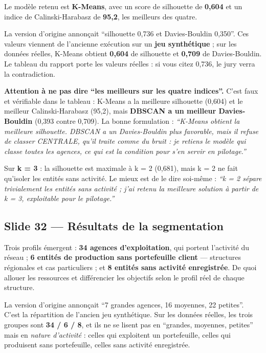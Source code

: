 \documentclass[a4paper,11pt]{article}
\begin{document}
Le modèle retenu est \textbf{K-Means}, avec un score de silhouette de
\textbf{0,604} et un indice de Calinski-Harabasz de \textbf{95,2}, les meilleurs
des quatre.

\begin{corrige}
La version d'origine annonçait \enquote{silhouette 0,736 et Davies-Bouldin
0,350}. Ces valeurs viennent de l'ancienne exécution sur un \textbf{jeu
synthétique} ; sur les données réelles, K-Means obtient \textbf{0,604} de
silhouette et \textbf{0,709} de Davies-Bouldin. Le tableau du rapport porte les
valeurs réelles : si vous citez 0,736, le jury verra la contradiction.
\end{corrige}

\begin{coeur}
\textbf{Attention à ne pas dire \enquote{les meilleurs sur les quatre
indices}.} C'est faux et vérifiable dans le tableau : K-Means a la meilleure
silhouette (0,604) et le meilleur Calinski-Harabasz (95,2), mais \textbf{DBSCAN
a un meilleur Davies-Bouldin} (0,393 contre 0,709). La bonne formulation :
\emph{\enquote{K-Means obtient la meilleure silhouette. DBSCAN a un
Davies-Bouldin plus favorable, mais il refuse de classer CENTRALE, qu'il traite
comme du bruit : je retiens le modèle qui classe toutes les agences, ce qui est
la condition pour s'en servir en pilotage.}}
\end{coeur}

\begin{note}
\small Sur \textbf{k = 3} : la silhouette est maximale à k = 2 (0,681), mais
k = 2 ne fait qu'isoler les entités sans activité. Le mieux est de le dire
soi-même : \emph{\enquote{k = 2 sépare trivialement les entités sans activité ;
j'ai retenu la meilleure solution à partir de k = 3, exploitable pour le
pilotage.}}
\end{note}

\subsection*{Slide 32 --- Résultats de la segmentation}

Trois profils émergent : \textbf{34 agences d'exploitation}, qui portent
l'activité du réseau ; \textbf{6 entités de production sans portefeuille
client} --- structures régionales et cas particuliers ; et \textbf{8 entités
sans activité enregistrée}. De quoi allouer les ressources et différencier les
objectifs selon le profil réel de chaque structure.

\begin{corrige}
La version d'origine annonçait \enquote{7 grandes agences, 16 moyennes,
22 petites}. C'est la répartition de l'ancien jeu synthétique. Sur les données
réelles, les trois groupes sont \textbf{34 / 6 / 8}, et ils ne se lisent pas en
\enquote{grandes, moyennes, petites} mais en \emph{nature d'activité} : celles
qui exploitent un portefeuille, celles qui produisent sans portefeuille, celles
sans activité enregistrée.
\end{corrige}
\end{document}
